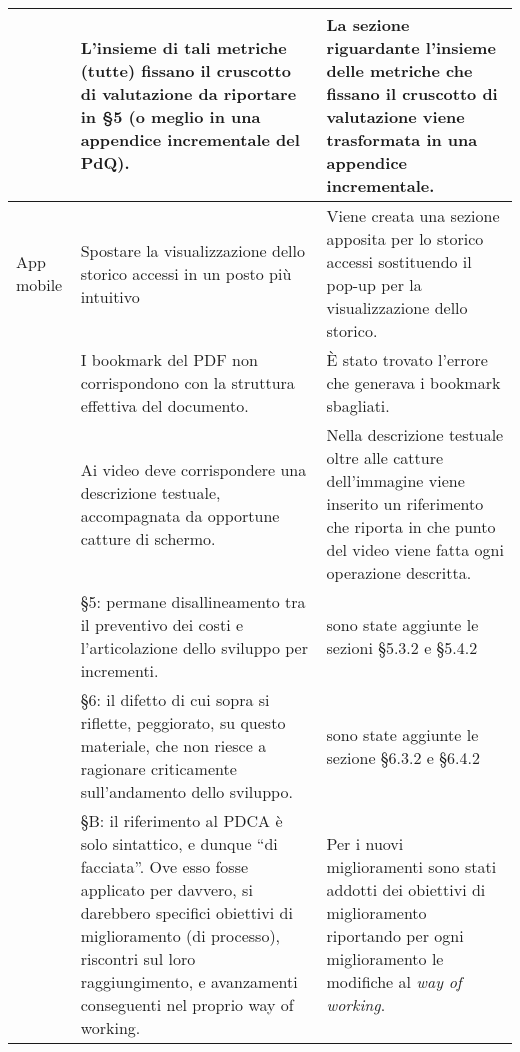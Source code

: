 {\begin{longtable}{ C{2.2cm} C{6cm} C{6cm}}
		\PdQ &  L’insieme di tali metriche (tutte) fissano il cruscotto di valutazione da riportare in §5 (o meglio in una appendice incrementale del PdQ). & La sezione riguardante l'insieme delle metriche che fissano il cruscotto di valutazione viene trasformata in una appendice incrementale.\\
		
		\hline
		
		App mobile & Spostare la visualizzazione dello storico accessi in un posto più intuitivo & Viene creata una sezione apposita per lo storico accessi sostituendo il pop-up per la visualizzazione dello storico.\\
		
		\NdP & I bookmark del PDF non corrispondono con la struttura effettiva del
		documento. & È stato trovato l'errore che generava i bookmark sbagliati.\\
		
		\MU & Ai video deve corrispondere una descrizione testuale, accompagnata da opportune catture di schermo. & Nella descrizione testuale oltre alle catture dell'immagine viene inserito un riferimento che riporta in che punto del video viene fatta ogni operazione descritta.\\
		 
		\PdP & §5: permane disallineamento tra il preventivo dei costi e
		l’articolazione dello sviluppo per incrementi.& sono state aggiunte le sezioni §5.3.2 e §5.4.2 \\
		
		\PdP & §6: il difetto di cui sopra si riflette, peggiorato, su questo materiale, che non riesce a ragionare criticamente sull’andamento dello sviluppo. & sono state aggiunte le sezione §6.3.2 e §6.4.2 \\
		
		\PdQ &  §B: il riferimento al PDCA è solo sintattico, e dunque “di facciata”. Ove esso fosse applicato per davvero, si darebbero specifici obiettivi di miglioramento (di processo), riscontri sul loro raggiungimento, e avanzamenti conseguenti nel proprio way of working. & Per i nuovi miglioramenti sono stati addotti dei obiettivi di miglioramento riportando per ogni miglioramento le modifiche al \textsl{way of working}.\\
		
	\end{longtable}
}

